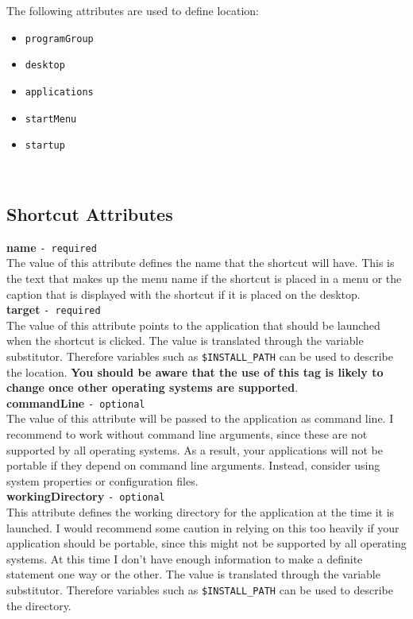 The following attributes are used to define location:
\begin{itemize}
\item \texttt{programGroup}
\item \texttt{desktop}
\item \texttt{applications}
\item \texttt{startMenu}
\item \texttt{startup}
\end{itemize}\

\subsection{Shortcut Attributes}

\textbf{name} \texttt{- required}\\

The value of this attribute defines the name that the shortcut will
have. This is the text that makes up the menu name if the shortcut is
placed in a menu or the caption that is displayed with the shortcut if
it is placed on the desktop.\\

\textbf{target} \texttt{- required}\\

The value of this attribute points to the application that should be
launched when the shortcut is clicked. The value is translated through
the variable substitutor. Therefore variables such as
\texttt{\$INSTALL\_PATH} can be used to describe the location.
\textbf{You should be aware that the use of this tag is likely to change
once other operating systems are supported}.\\

\textbf{commandLine} \texttt{- optional}\\

The value of this attribute will be passed to the application as command
line. I recommend to work without command line arguments, since these are
not supported by all operating systems. As a result, your applications
will not be portable if they depend on command line arguments. Instead,
consider using system properties or configuration files.\\

\textbf{workingDirectory} \texttt{- optional}\\

This attribute defines the working directory for the application at the
time it is launched. I would recommend some caution in relying on this
too heavily if your application should be portable, since this might not
be supported by all operating systems. At this time I don't have enough
information to make a definite statement one way or the other. The value
is translated through the variable substitutor. Therefore variables such
as \texttt{\$INSTALL\_PATH} can be used to describe the directory.\\

